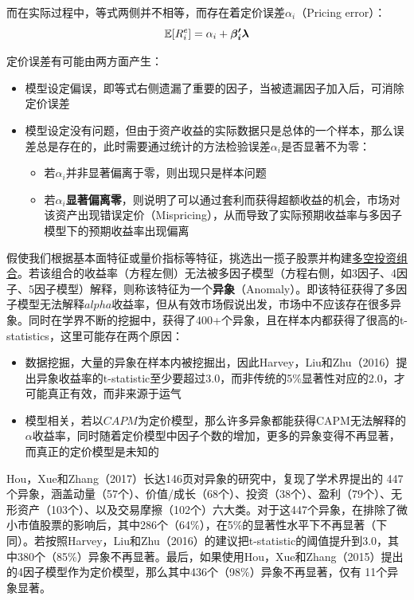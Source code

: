 \documentclass[11pt]{article}
\begin{document}
而在实际过程中，等式两侧并不相等，而存在着定价误差$\alpha_i$（Pricing error）：
\begin{equation*}
    \mathbb{E}[R_i^e] = \alpha_i + \bm{\beta_{i}' \lambda}
\end{equation*}

定价误差有可能由两方面产生：
\begin{itemize}
    \item 模型设定偏误，即等式右侧遗漏了重要的因子，当被遗漏因子加入后，可消除定价误差
    \item 模型设定没有问题，但由于资产收益的实际数据只是总体的一个样本，那么误差总是存在的，此时需要通过统计的方法检验误差$\alpha_i$是否显著不为零：
    \begin{itemize}
        \item 若$\alpha_i$并非显著偏离于零，则出现只是样本问题
        \item 若$\alpha_i$\textbf{显著偏离零}，则说明了可以通过套利而获得超额收益的机会，市场对该资产出现错误定价（Mispricing），从而导致了实际预期收益率与多因子模型下的预期收益率出现偏离
    \end{itemize}
\end{itemize}

假使我们根据基本面特征或量价指标等特征，挑选出一揽子股票并构建\uline{多空投资组合}。若该组合的收益率（方程左侧）无法被多因子模型（方程右侧，如3因子、4因子、5因子模型）解释，则称该特征为一个\textbf{异象}（Anomaly）。即该特征获得了多因子模型无法解释$alpha$收益率，但从有效市场假说出发，市场中不应该存在很多异象。同时在学界不断的挖掘中，获得了400+个异象，且在样本内都获得了很高的t-statistics，这里可能存在两个原因：
\begin{itemize}
    \item 数据挖掘，大量的异象在样本内被挖掘出，因此Harvey，Liu和Zhu（2016）提出异象收益率的t-statistic至少要超过3.0，而非传统的5\%显著性对应的2.0，才可能真正有效，而非来源于运气
    \item 模型相关，若以$CAPM$为定价模型，那么许多异象都能获得CAPM无法解释的$\alpha$收益率，同时随着定价模型中因子个数的增加，更多的异象变得不再显著，而真正的定价模型是未知的
\end{itemize}

Hou，Xue和Zhang（2017）长达146页对异象的研究中，复现了学术界提出的 447 个异象，涵盖动量（57个）、价值/成长（68个）、投资（38个）、盈利（79个）、无形资产（103个）、以及交易摩擦（102个）六大类。对于这447个异象，在排除了微小市值股票的影响后，其中286个（64\%），在5\%的显著性水平下不再显著（下同）。若按照Harvey，Liu和Zhu（2016）的建议把t-statistic的阈值提升到3.0，其中380个（85\%）异象不再显著。最后，如果使用Hou，Xue和Zhang（2015）提出的4因子模型作为定价模型，那么其中436个（98\%）异象不再显著，仅有 11个异象显著。
\end{document}
